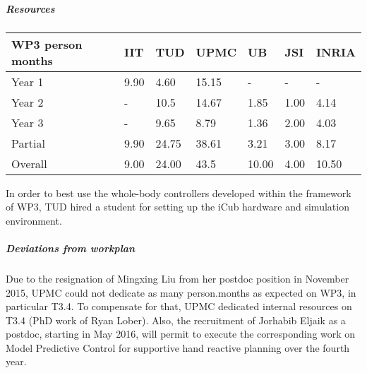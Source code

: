 
\subparagraph*{Resources}

\begin{center}
\begin{tabular}{|C{1.5cm}|C{1.5cm}|C{1.5cm}|C{2cm}|C{2cm}|C{2cm}|C{2cm}|}
\hline
\footnotesize \textbf{WP3 person months} & \footnotesize \textbf{IIT}&\footnotesize \textbf{TUD}&\footnotesize \textbf{UPMC}& \footnotesize \textbf{UB} &\footnotesize \textbf{JSI} &\footnotesize \textbf{INRIA} \\ \hline
\footnotesize Year 1 &  9.90 & 4.60 & 15.15 & - & - &  -   \\  \hline
\footnotesize Year 2 &  - & 10.5 & 14.67 & 1.85 & 1.00 &  4.14  \\  \hline
\footnotesize Year 3 &  - & 9.65 & 8.79 & 1.36 & 2.00 & 4.03 \\  \hline
\footnotesize Partial &  9.90 & 24.75 & 38.61 & 3.21 & 3.00 & 8.17 \\ 
\hline \hline
\footnotesize Overall &  9.00 & 24.00 & 43.5 & 10.00 & 4.00 & 10.50 \\ \hline
\end{tabular}
\end{center}

In order to best use the whole-body controllers developed within the framework of WP3, TUD hired a student for setting up the iCub hardware and simulation environment.

\subparagraph*{Deviations from workplan}

Due to the resignation of Mingxing Liu from her postdoc position in November 2015, UPMC could not dedicate as many person.months as expected on WP3, in particular T3.4. To compensate for that, UPMC dedicated internal resources on T3.4 (PhD work of Ryan Lober). Also, the recruitment of Jorhabib Eljaik as a postdoc, starting in May 2016, will permit to execute the corresponding work on Model Predictive Control for supportive hand reactive planning over the fourth year. 



